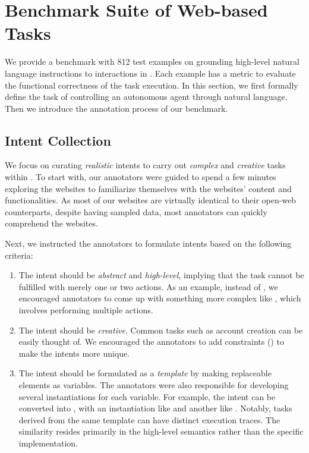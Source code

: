 \documentclass{article}
\begin{document}
\section{Benchmark Suite of Web-based Tasks}\label{sec:benchmark}
We provide a benchmark with 812 test examples on grounding high-level natural language instructions to interactions in \ours.
Each example has a metric to evaluate the functional correctness of the task execution. 
In this section, we first formally define the task of controlling an autonomous agent through natural language. Then we introduce the annotation process of our benchmark.

\subsection{Intent Collection}\label{sec:intent_collection}
We focus on curating \emph{realistic} intents to carry out \emph{complex} and \emph{creative} tasks within \ours.
To start with, our annotators were guided to spend a few minutes exploring the websites to familiarize themselves with the websites' content and functionalities. As most of our websites are virtually identical to their open-web counterparts, despite having sampled data, most annotators can quickly comprehend the websites.

Next, we instructed the annotators to formulate intents based on the following criteria:
\begin{enumerate}[label=(\arabic*),leftmargin=20pt,noitemsep]
    \item The intent should be \emph{abstract} and \emph{high-level}, implying that the task cannot be fulfilled with merely one or two actions. As an example, instead of , we encouraged annotators to come up with something more complex like , which involves performing multiple actions.
    \item The intent should be \emph{creative}. Common tasks such as account creation can be easily thought of. We encouraged the annotators to add constraints (\eg {}) to make the intents more unique.
    \item The intent should be formulated as a \emph{template} by making replaceable elements as variables. The annotators were also responsible for developing several instantiations for each variable. For example, the intent  can be converted into , with an instantiation like  and another like . 
    Notably, tasks derived from the same template can have distinct execution traces. The similarity resides primarily in the high-level semantics rather than the specific implementation. %
\end{enumerate}
\end{document}
